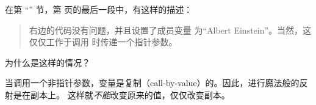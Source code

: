 \begin{Exercise}[title={指针和反射},difficulty=5]
\label{ex:pointers and reflection}
\Question
在第 ``'' 节，第 \pageref{sec:introspection and reflection} 
页的最后一段中，有这样的描述：
\begin{quote}
右边的代码没有问题，并且设置了成员变量  
为``Albert Einstein''。当然，这仅仅工作于调用  时传递一个指针参数。
\end{quote}
为什么是这样的情况？
\end{Exercise}

\begin{Answer}
\Question
当调用一个非指针参数，变量是复制（call-by-value）的。因此，进行魔法般的反射是在副本上。
这样就\emph{不能}改变原来的值，仅仅改变副本。
\end{Answer}
